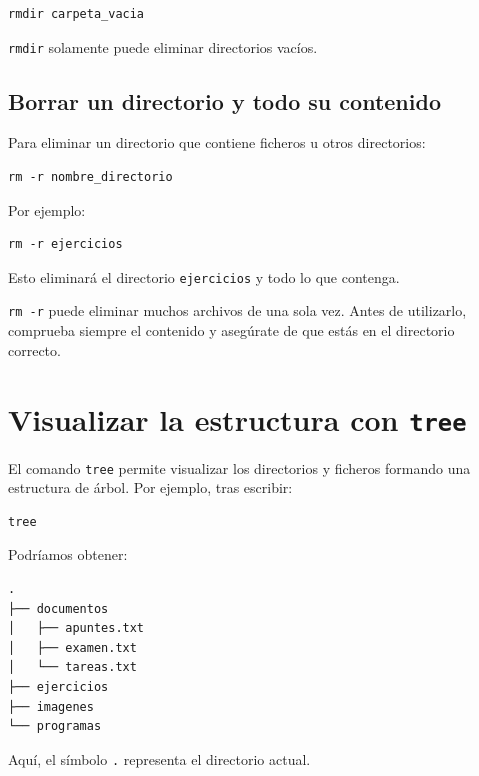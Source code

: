 \documentclass[11pt,a4paper]{article}
\begin{document}
\begin{lstlisting}
rmdir carpeta_vacia
\end{lstlisting}


\noindent \texttt{rmdir} solamente puede eliminar directorios vacíos.


\subsection{Borrar un directorio y todo su contenido}


Para eliminar un directorio que contiene ficheros u otros directorios:


\begin{lstlisting}
rm -r nombre_directorio
\end{lstlisting}


\noindent Por ejemplo:


\begin{lstlisting}
rm -r ejercicios
\end{lstlisting}


\noindent Esto eliminará el directorio \texttt{ejercicios} y todo lo que
contenga.


\begin{peligro}
\texttt{rm -r} puede eliminar muchos archivos de una sola vez. Antes de utilizarlo, comprueba siempre el contenido y asegúrate de que estás en el directorio correcto.
\end{peligro}


\section{Visualizar la estructura con \texttt{tree}}


El comando \texttt{tree} permite visualizar los directorios y ficheros formando una estructura de árbol. Por ejemplo, tras escribir:


\begin{lstlisting}
tree
\end{lstlisting}


\noindent Podríamos obtener:


\begin{lstlisting}
.
├── documentos
│   ├── apuntes.txt
│   ├── examen.txt
│   └── tareas.txt
├── ejercicios
├── imagenes
└── programas
\end{lstlisting}


\noindent Aquí, el símbolo \texttt{.} representa el directorio actual.
\end{document}

